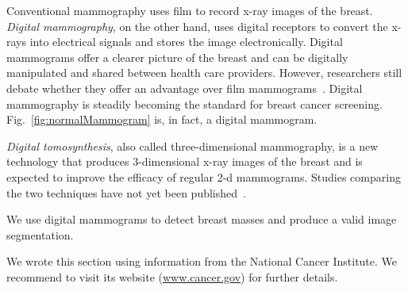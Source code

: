 Conventional mammography uses film to record x-ray images of the breast. \emph{Digital mammography}, on the other hand, uses digital receptors to convert the x-rays into electrical signals and stores the image electronically. Digital mammograms offer a clearer picture of the breast and can be digitally manipulated and shared between health care providers.
However, researchers still debate whether they offer an advantage over film mammograms~\cite{Kerlikowske2011, Pisano2008, Skaane2007}. Digital mammography is steadily becoming the standard for breast cancer screening. Fig.~\ref{fig:normalMammogram} is, in fact, a digital mammogram.

\emph{Digital tomosynthesis}, also called three-dimensional mammography, is a new technology that produces 3-dimensional x-ray images of the breast and is expected to improve the efficacy of regular 2-d mammograms. Studies comparing the two techniques have not yet been published~\cite{Mammograms2014}.

We use digital mammograms to detect breast masses and produce a valid image segmentation.

We wrote this section using information from the National Cancer Institute. We recommend to visit its website (\url{www.cancer.gov}) for further details.
